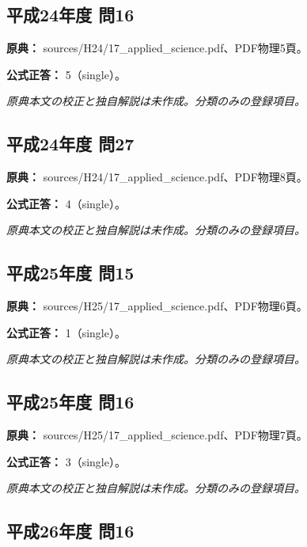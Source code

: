 \subsection{平成24年度 問16}
\label{q:h24-reg-applied-16}

\noindent\textbf{原典：} sources/H24/17\_applied\_science.pdf、PDF物理5頁。

\textbf{公式正答：} 5（single）。

\par\textit{原典本文の校正と独自解説は未作成。分類のみの登録項目。}

\subsection{平成24年度 問27}
\label{q:h24-reg-applied-27}

\noindent\textbf{原典：} sources/H24/17\_applied\_science.pdf、PDF物理8頁。

\textbf{公式正答：} 4（single）。

\par\textit{原典本文の校正と独自解説は未作成。分類のみの登録項目。}

\subsection{平成25年度 問15}
\label{q:h25-reg-applied-15}

\noindent\textbf{原典：} sources/H25/17\_applied\_science.pdf、PDF物理6頁。

\textbf{公式正答：} 1（single）。

\par\textit{原典本文の校正と独自解説は未作成。分類のみの登録項目。}

\subsection{平成25年度 問16}
\label{q:h25-reg-applied-16}

\noindent\textbf{原典：} sources/H25/17\_applied\_science.pdf、PDF物理7頁。

\textbf{公式正答：} 3（single）。

\par\textit{原典本文の校正と独自解説は未作成。分類のみの登録項目。}

\subsection{平成26年度 問16}
\label{q:h26-reg-applied-16}


